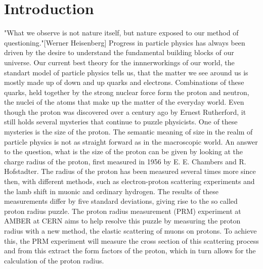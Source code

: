 \chapter{Introduction} \label{chap:introduction}
"What we observe is not nature itself, but nature exposed to our method of questioning."[Werner Heisenberg]\autocite{Heisenberg1958}
\newline
Progress in particle physics has always been driven by the desire to understand the fundamental building blocks of our universe.
\newline Our current best theory for the innnerworkings of our world,
the standart model of particle physics tells us, that the matter we see around us is mostly made up of down and up quarks and electrons.
Combinations of these quarks, held together by the strong nuclear force form the proton and neutron, the nuclei of the atoms that make up the matter of the everyday world.\autocite{Workman:2836514}
Even though the proton was discovered over a century ago by Ernest Rutherford\autocite{discoveryProton}, it still holds several mysteries that continue to puzzle physicists.
One of these mysteries is the size of the proton.
\newline
The semantic meaning of size in the realm of particle physics is not as straight forward as in the macroscopic world. An answer to the question,
what is the size of the proton can be given by looking at the charge radius of the proton, first measured in 1956 by E. E. Chambers and R. Hofstadter.\autocite{Hofstadter1956}
\newline
The radius of the proton has been measured several times more since then, with different methods, such as electron-proton scattering experiments and the lamb shift in muonic and ordinary hydrogen.
The results of these measurements differ by five standard deviations, giving rise to the so called proton radius puzzle.\autocite{ProposalAmber}
\newline
The proton radius measurement (PRM) experiment at AMBER at CERN aims to help resolve this puzzle by measuring the proton radius with a new method,
 the elastic scattering of muons on protons.
\newline
To achieve this, the PRM experiment will measure the cross section of this scattering process and from this extract the form factors of the proton, which in turn allows for the calculation of the proton radius.
